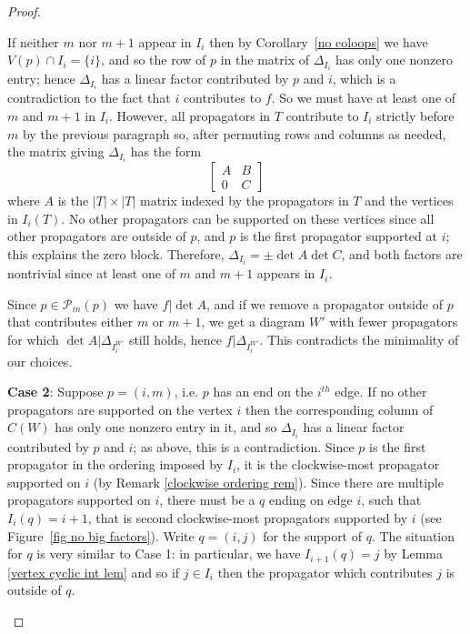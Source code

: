 \documentclass[11pt]{article}
\newcommand{\cP}{\mathcal{P}}
\theoremstyle{remark}
\theoremstyle{definition}
\begin{document}
\begin{proof}
\begin{enumerate}
If neither $m$ nor $m+1$ appear in $I_i$ then by Corollary~\ref{no coloops} we have $V(p) \cap I_i = \{i\}$, and so the row of $p$ in the matrix of $\Delta_{I_i}$ has only one nonzero entry; hence $\Delta_{I_i}$ has a linear factor contributed by $p$ and $i$, which is a contradiction to the fact that $i$ contributes to $f$.  So we must have at least one of $m$ and $m+1$ in $I_i$. However, all propagators in $T$ contribute to $I_{i}$ strictly before $m$ by the previous paragraph so, after permuting rows and columns as needed, the matrix giving $\Delta_{I_i}$ has the form
\[
\begin{bmatrix} A & B \\ 0 & C\end{bmatrix}
\]
where $A$ is the $|T|\times |T|$ matrix indexed by the propagators in $T$ and the vertices in $I_i(T)$. No other propagators can be supported on these vertices since all other propagators are outside of $p$, and $p$ is the first propagator supported at $i$; this explains the zero block.  Therefore, $\Delta_{I_i} = \pm \det A \det C$, and both factors are nontrivial since at least one of $m$ and $m+1$ appears in $I_i$.  

Since $p\in \cP_{in}(p)$ we have $f|\det A$, and if we remove a propagator outside of $p$ that contributes either $m$ or $m+1$, we get a diagram $W'$ with fewer propagators for which $\det A | \Delta_{I^{W'}_i}$ still holds, hence $f|\Delta_{I^{W'}_i}$.  This contradicts the minimality of our choices. 

\textbf{Case 2}: Suppose $p = (i, m)$, i.e. $p$ has an end on the $i^{th}$ edge. If no other propagators are supported on the vertex $i$ then the corresponding column of $C(W)$ has only one nonzero entry in it, and so $\Delta_{I_i}$ has a linear factor contributed by $p$ and $i$; as above, this is a contradiction.
Since $p$ is the first propagator in the ordering imposed by $I_i$, it is the clockwise-most propagator supported on $i$ (by Remark {\ref{clockwise ordering rem}}). Since there are multiple propagators supported on $i$, there must be a $q$ ending on edge $i$, such that $I_i(q) = i+1$, that is second clockwise-most propagators supported by $i$ (see Figure~\ref{fig no big factors}).
Write $q = (i, j)$ for the support of $q$.  The situation for $q$ is very similar to Case 1: in particular, we have $I_{i+1}(q) = j$ by Lemma {\ref{vertex cyclic int lem}} and so if $j\in I_i$ then the propagator which contributes $j$ is outside of $q$.


\end{enumerate}
\end{proof}
\end{document}
